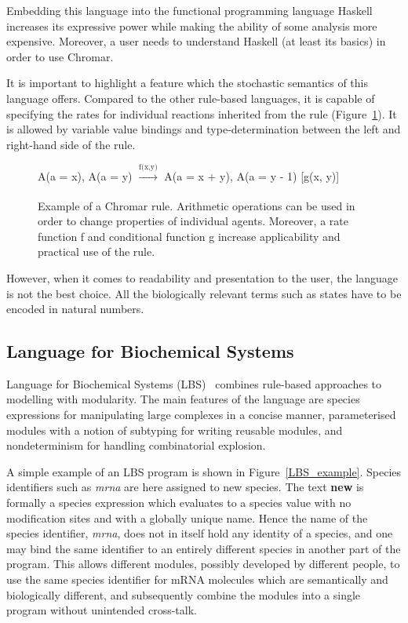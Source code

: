 \documentclass[11pt,a4paper]{report}
\begin{document}
Embedding this language into the functional programming language Haskell increases its expressive power while making the ability of some analysis more expensive. Moreover, a user needs to understand Haskell (at least its basics) in order to use Chromar.

It is important to highlight a feature which the stochastic semantics of this language offers. Compared to the other rule-based languages, it is capable of specifying the rates for individual reactions inherited from the rule (Figure~\ref{chromar_rule}). It is allowed by variable value bindings and type-determination between the left and right-hand side of the rule.

\begin{figure}[!h]
\begin{center}
A(a = x), A(a = y) $\xrightarrow[]{\text{f(x,y)}}$ A(a = x + y), A(a = y - 1) [g(x, y)]
\end{center}
\caption{Example of a Chromar rule. Arithmetic operations can be used in order to change properties of individual agents. Moreover, a rate function f and conditional function g increase applicability and practical use of the rule.}\label{chromar-rule}\label{chromar_rule}
\end{figure}

However, when it comes to readability and presentation to the user, the language is not the best choice. All the biologically relevant terms such as states have to be encoded in natural numbers.

\subsection{Language for Biochemical Systems}

Language for Biochemical Systems (LBS)~\cite{Pedersen} combines rule-based approaches to modelling with modularity. The main features of the language are species expressions for manipulating large complexes in a concise manner, parameterised modules with a notion of subtyping for writing reusable modules, and nondeterminism for handling combinatorial explosion.

A simple example of an LBS program is shown in Figure~\ref{LBS_example}. Species identifiers such as \emph{mrna} are here assigned to new species. The text \textbf{new{}} is formally a species expression which evaluates to a species value with no modification sites and with a globally unique name. Hence the name of the species identifier, \emph{mrna}, does not in itself hold any identity of a species, and one may bind the same identifier to an entirely different species in another part of the program. This allows different modules, possibly developed by different people, to use the same species identifier for mRNA molecules which are semantically and biologically different, and subsequently combine the modules into a single program without unintended cross-talk.
\end{document}
